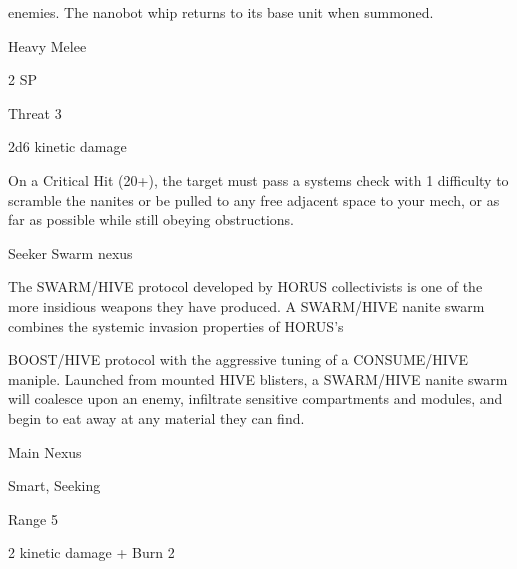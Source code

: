 enemies. The nanobot whip returns to its base unit when summoned.   

Heavy Melee
 
2 SP
 
Threat 3
 
2d6 kinetic damage
 
On a Critical Hit (20+), the target must pass a systems check with 1 difficulty to scramble the  
nanites or be pulled to any free adjacent space to your mech, or as far as possible while still  
obeying obstructions.
 

Seeker Swarm nexus  

The SWARM/HIVE protocol developed by HORUS collectivists is one of the more insidious weapons they  
have produced. A SWARM/HIVE nanite swarm combines the systemic invasion properties of HORUS’s  

BOOST/HIVE protocol with the aggressive tuning of a CONSUME/HIVE maniple. Launched from mounted  
HIVE blisters, a SWARM/HIVE nanite swarm will coalesce upon an enemy, infiltrate sensitive compartments  
and modules, and begin to eat away at any material they can find.  

Main Nexus
 
Smart, Seeking
 

                                                                                                           


Range 5
 
2 kinetic damage + Burn 2
 

                                                                                                          
